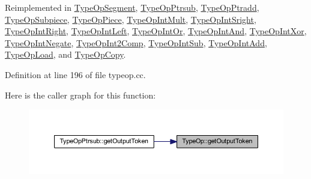 Reimplemented in \mbox{\hyperlink{class_type_op_segment_a266bcb14bb682b5ebc298e06f7a9c12e}{Type\+Op\+Segment}}, \mbox{\hyperlink{class_type_op_ptrsub_a1830a4ee48307559c378c4147aa19979}{Type\+Op\+Ptrsub}}, \mbox{\hyperlink{class_type_op_ptradd_a129573eb45f5e95826e557032aa785a1}{Type\+Op\+Ptradd}}, \mbox{\hyperlink{class_type_op_subpiece_ac93ca300b551f16888008869eca39150}{Type\+Op\+Subpiece}}, \mbox{\hyperlink{class_type_op_piece_a951c2e42be991699b04945bb1c71de04}{Type\+Op\+Piece}}, \mbox{\hyperlink{class_type_op_int_mult_abb986ab298da31068ac30163e6755e18}{Type\+Op\+Int\+Mult}}, \mbox{\hyperlink{class_type_op_int_sright_a2e2989e20e9ccdcd2e56d719202ac0fc}{Type\+Op\+Int\+Sright}}, \mbox{\hyperlink{class_type_op_int_right_a3c470ddca0dbdab3b01d8734308edd26}{Type\+Op\+Int\+Right}}, \mbox{\hyperlink{class_type_op_int_left_a0c99823cd347ae28c3608a3f02fdda09}{Type\+Op\+Int\+Left}}, \mbox{\hyperlink{class_type_op_int_or_a73a740a728241ee2e922b29134c49cd4}{Type\+Op\+Int\+Or}}, \mbox{\hyperlink{class_type_op_int_and_a4f06c12390fbbad57e41537047666e2d}{Type\+Op\+Int\+And}}, \mbox{\hyperlink{class_type_op_int_xor_aecfecb807f0b493995187353fc89b14b}{Type\+Op\+Int\+Xor}}, \mbox{\hyperlink{class_type_op_int_negate_ab07156bd47d9e57427cb3b32aa52f12e}{Type\+Op\+Int\+Negate}}, \mbox{\hyperlink{class_type_op_int2_comp_aa418bd590316df07485e1673c08b900f}{Type\+Op\+Int2\+Comp}}, \mbox{\hyperlink{class_type_op_int_sub_a7cba3a83ac6362edcb6d3c8120ac6cd5}{Type\+Op\+Int\+Sub}}, \mbox{\hyperlink{class_type_op_int_add_aae4df67ef6e65039c3a05cea8bdef6c4}{Type\+Op\+Int\+Add}}, \mbox{\hyperlink{class_type_op_load_a212b3d08a86b73ca49c2adf1aac7b60a}{Type\+Op\+Load}}, and \mbox{\hyperlink{class_type_op_copy_a2a8b45de9ac53dd673c289e1c13feb08}{Type\+Op\+Copy}}.



Definition at line 196 of file typeop.\+cc.

Here is the caller graph for this function\+:
\nopagebreak
\begin{figure}[H]
\begin{center}
\leavevmode
\includegraphics[width=350pt]{class_type_op_a7150ac93bb03a993735c829deb5237e7_icgraph}
\end{center}
\end{figure}
\mbox{\label{class_type_op_a8440bbfcbdd6209b625048ee20db29c9}} 
